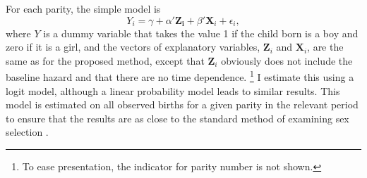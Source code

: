 \documentclass[12pt,letterpaper]{article}
\begin{document}
For each parity, the simple model is
\begin{equation}
Y_i = \gamma + \alpha' \mathbf{Z_i} + \beta' \mathbf{X}_{i} + \epsilon_i,
\end{equation}
where $Y$ is a dummy variable that takes the value 1 if the child born is a boy and zero 
if it is a girl, and the vectors of explanatory variables, $\mathbf{Z}_{i}$ and 
$\mathbf{X}_{i}$, are the same as for the proposed method, except that 
$\mathbf{Z}_{i}$ obviously does not include the baseline hazard and that there are 
no time dependence.%
\footnote{
To ease presentation, the indicator for parity number is not shown.
}
I estimate this using a logit model, although a linear probability model leads to
similar results.
This model is estimated on all observed births for a given parity in the relevant 
period to ensure that the results are as close to the standard method of 
examining sex selection \citep[see, for example, ][]{retherford03b,jha06,abrevaya09}.
\end{document}
